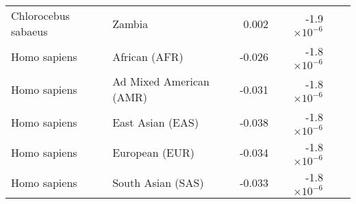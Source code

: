 \begin{tabular}{|l|l|r|r|r|r|}
    Chlorocebus sabaeus & Zambia & 0.002 & -1.9$\times 10^{-6}$ \\
    Homo sapiens & African (AFR) & -0.026 & -1.8$\times 10^{-6}$ \\
    Homo sapiens & Ad Mixed American (AMR) & -0.031 & -1.8$\times 10^{-6}$ \\
    Homo sapiens & East Asian (EAS) & -0.038 & -1.8$\times 10^{-6}$ \\
    Homo sapiens & European (EUR) & -0.034 & -1.8$\times 10^{-6}$ \\
    Homo sapiens & South Asian (SAS) & -0.033 & -1.8$\times 10^{-6}$ \\
    \bottomrule
\end{tabular}
